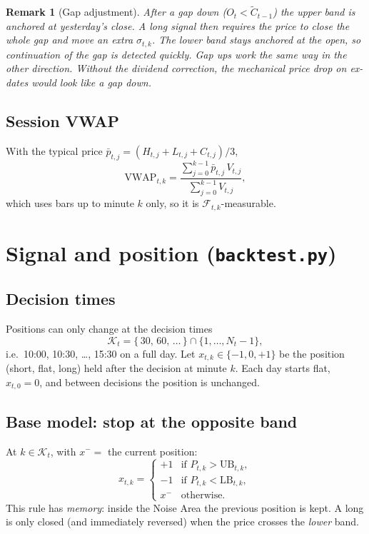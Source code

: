 \documentclass[11pt,a4paper]{article}
\newtheorem*{remark}{Remark}
\newcommand{\UB}{\mathrm{UB}}
\newcommand{\LB}{\mathrm{LB}}
\newcommand{\VWAP}{\mathrm{VWAP}}
\newcommand{\1}{\mathbf{1}}
\begin{document}
\begin{remark}[Gap adjustment]
After a gap down ($O_t < \tilde C_{t-1}$) the upper band is anchored at yesterday's close. A long signal
then requires the price to close the whole gap \emph{and} move an extra $\sigma_{t,k}$. The lower band
stays anchored at the open, so continuation of the gap is detected quickly. Gap ups work the same way
in the other direction. Without the dividend correction, the mechanical price drop on ex-dates would look
like a gap down.
\end{remark}

\subsection{Session VWAP}
With the typical price $\bar p_{t,j} = (H_{t,j}+L_{t,j}+C_{t,j})/3$,
\begin{equation}
  \VWAP_{t,k} = \frac{\sum_{j=0}^{k-1} \bar p_{t,j}\,V_{t,j}}{\sum_{j=0}^{k-1} V_{t,j}},
\end{equation}
which uses bars up to minute $k$ only, so it is $\mathcal F_{t,k}$-measurable.

\section{Signal and position (\texttt{backtest.py})}

\subsection{Decision times}
Positions can only change at the decision times
\[
  \mathcal K_t = \{\,30,\,60,\,\dots\,\} \cap \{1,\dots,N_t-1\},
\]
i.e.\ 10:00, 10:30, \dots, 15:30 on a full day. Let $x_{t,k} \in \{-1, 0, +1\}$ be the position
(short, flat, long) held after the decision at minute $k$. Each day starts flat, $x_{t,0} = 0$, and
between decisions the position is unchanged.

\subsection{Base model: stop at the opposite band}
At $k\in\mathcal K_t$, with $x^- = $ the current position:
\begin{equation}\label{eq:base}
  x_{t,k} =
  \begin{cases}
    +1 & \text{if } P_{t,k} > \UB_{t,k},\\
    -1 & \text{if } P_{t,k} < \LB_{t,k},\\
    x^- & \text{otherwise.}
  \end{cases}
\end{equation}
This rule has \emph{memory}: inside the Noise Area the previous position is kept. A long is only closed
(and immediately reversed) when the price crosses the \emph{lower} band.
\end{document}
